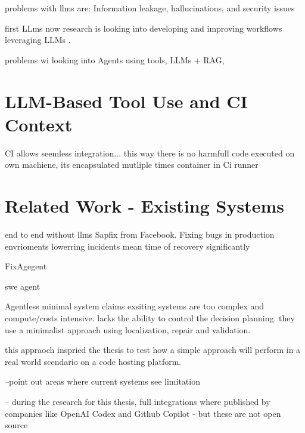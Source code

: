 problems with llms are: Information leakage, hallucinations, and security issues

first LLms now research is looking into developing and improving workflows leveraging LLMs \cite{puvvadiCodingAgentsComprehensive2025}.

problems wi
looking into Agents using tools, LLMs + RAG,

\section{LLM-Based Tool Use and CI Context}

CI allows seemless integration...
this way there is no harmfull code executed on own machiene, its encapsulated mutliple times container in Ci runner

\section{Related Work - Existing Systems}


end to end without llms Sapfix from Facebook. Fixing bugs in production envrioments lowerring incidents mean time of recovery significantly \cite{margineanSapFixAutomatedEndtoEnd2019}

FixAgegent \cite{leeUnifiedDebuggingApproach2024}

swe agent \cite{yangSWEagentAgentComputerInterfaces2024}

Agentless minimal system \cite{xiaAgentlessDemystifyingLLMbased2024}
claims exsiting systems are too complex and compute/costs intensive.
lacks the ability to control the decision planning.
they use a minimalist approach using localization, repair and validation.


this appraoch inspried the thesis to test how a simple approach will perform in a real world scendario on a code hosting platform.


--point out areas where current systems see limitation

-- during the research for this thesis, full integrations where published by companies like OpenAI Codex and Github Copilot - but these are not open source 